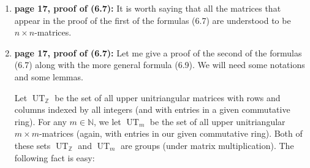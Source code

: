 \documentclass[numbers=enddot,12pt,final,onecolumn,notitlepage]{scrartcl}%
\theoremstyle{definition}
\begin{document}
\begin{enumerate}
Fortunately, there is a simple shortcut for this: Let $\operatorname*{UT}%
\nolimits_{\mathbb{Z}}$ be the set of all upper unitriangular matrices with
rows and columns indexed by all integers (and with entries in a given base
ring, which in our case is the polynomial ring over $\mathbb{Z}$ in the
variables $x_{i}$ for $i\in\left[  n\right]  $ and $a_{j}$ for $j\in
\mathbb{Z}$). This set $\operatorname*{UT}\nolimits_{\mathbb{Z}}$ is closed
under matrix multiplication, thus is a monoid. Moreover, each matrix
$A\in\operatorname*{UT}\nolimits_{\mathbb{Z}}$ can be written as $I+M$ for
some strictly upper-triangular matrix $M$, and thus has an inverse
$A^{-1}=\left(  I+M\right)  ^{-1}$, which can be computed by the formula
$\left(  I+M\right)  ^{-1}=I-M+M^{2}-M^{3}+M^{4}\pm\cdots$ (this infinite sum
makes sense, since the nonzero entries of each power $M^{i}$ start no earlier
than $i$ steps above the main diagonal\footnote{That is: For any
$u,v\in\mathbb{Z}$ and any $i\in\mathbb{N}$, the $\left(  u,v\right)  $-th
entry of $M^{i}$ is $0$ whenever $v-u<i$, and therefore the $\left(
u,v\right)  $-th entry of the infinite sum $I-M+M^{2}-M^{3}+M^{4}\pm\cdots$ is
only affected by the first $v-u+1$ addends of this sum.}). This inverse
$A^{-1}=I-M+M^{2}-M^{3}+M^{4}\pm\cdots$ again belongs to $\operatorname*{UT}%
\nolimits_{\mathbb{Z}}$ (since all the matrices $M,M^{2},M^{3},M^{4},\ldots$
are strictly upper-triangular). Hence, each element of the monoid
$\operatorname*{UT}\nolimits_{\mathbb{Z}}$ has an inverse. Thus,
$\operatorname*{UT}\nolimits_{\mathbb{Z}}$ is a group with respect to matrix
multiplication. Since both matrices $\mathbf{E}\left(  x\mid a\right)  $ and
$\mathbf{H}\left(  x\mid a\right)  $ belong to this group $\operatorname*{UT}%
\nolimits_{\mathbb{Z}}$, we can thus conclude $\mathbf{E}\left(  x\mid
a\right)  =\mathbf{H}\left(  x\mid a\right)  ^{-1}$ from $\mathbf{E}\left(
x\mid a\right)  \cdot\mathbf{H}\left(  x\mid a\right)  =I_{\mathbb{Z}}$.

\item \textbf{page 17, proof of (6.7):} It is worth saying that all the
matrices that appear in the proof of the first of the formulas (6.7) are
understood to be $n\times n$-matrices.

\item \textbf{page 17, proof of (6.7):} Let me give a proof of the second of
the formulas (6.7) along with the more general formula (6.9). We will need
some notations and some lemmas.

Let $\operatorname*{UT}\nolimits_{\mathbb{Z}}$ be the set of all upper
unitriangular matrices with rows and columns indexed by all integers (and with
entries in a given commutative ring). For any $m\in\mathbb{N}$, we let
$\operatorname*{UT}\nolimits_{m}$ be the set of all upper unitriangular
$m\times m$-matrices (again, with entries in our given commutative ring). Both
of these sets $\operatorname*{UT}\nolimits_{\mathbb{Z}}$ and
$\operatorname*{UT}\nolimits_{m}$ are groups (under matrix multiplication).
The following fact is easy:


\end{enumerate}
\end{document}

